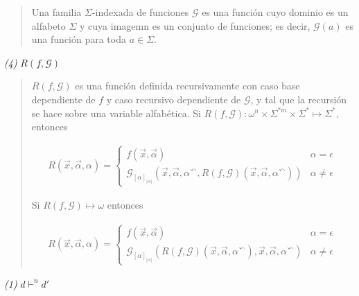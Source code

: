 \documentclass[a4paper, 12pt]{article}
\begin{document}
\small
\begin{quote}

Una familia $\Sigma$-indexada de funciones $\mathcal{G}$ es una función cuyo dominio es
un alfabeto $\Sigma$ y cuya imagemn es un conjunto de funciones; es decir,
$\mathcal{G}(a)$ es una función para toda $a \in \Sigma$.

\end{quote}
\normalsize

\textit{(4)} $R(f, \mathcal{G})$


\small
\begin{quote}

$R(f, \mathcal{G})$ es una función definida recursivamente con caso base
dependiente de $f$ y caso recursivo dependiente de $\mathcal{G}$, y tal que la
recursión se hace sobre una variable alfabética. Si $R(f,
\mathcal{G}) :  \omega^{n} \times \Sigma^{*m} \times \Sigma^{*} \mapsto
\Sigma^{*}$, entonces 

\begin{align*}
    R(\vec{x}, \vec{\alpha}, \alpha) = \begin{cases}
        f(\vec{x}, \vec{\alpha}) & \alpha = \epsilon \\ 
        \mathcal{G}_{[\alpha]_{|\alpha|}} \left( \vec{x}, \vec{\alpha}, \alpha {}^{\curvearrowleft},
        R(f, \mathcal{G})(\vec{x}, \vec{\alpha}, \alpha {}^{\curvearrowleft})
    \right)  & \alpha \neq \epsilon
    \end{cases} 
\end{align*}

Si $R(f, \mathcal{G}) \mapsto \omega$ entonces 

\begin{align*}
    R(\vec{x}, \vec{\alpha}, \alpha) = \begin{cases}
        f(\vec{x}, \vec{\alpha}) & \alpha = \epsilon \\ 
        \mathcal{G}_{[\alpha]_{|\alpha|}} \left( R(f, \mathcal{G})(\vec{x},
        \vec{\alpha}, \alpha {}^{\curvearrowleft}), \vec{x}, \vec{\alpha},
    \alpha {}^{\curvearrowleft} \right)  & \alpha \neq \epsilon
    \end{cases}
\end{align*}

\end{quote}
\normalsize

\pagebreak 

\textit{(1)} $d \vdash^n d'$
\end{document}
